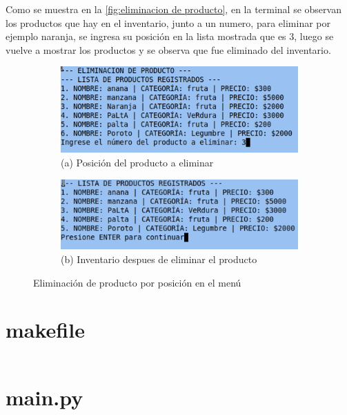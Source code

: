 \documentclass[12pt]{article}
\begin{document}
Como se muestra en la \autoref{fig:eliminacion de producto}, en la terminal se observan los productos que hay en el inventario, junto a un numero, para eliminar por ejemplo naranja, se ingresa su posición en la lista mostrada que es $3$, luego se vuelve a mostrar los productos y se observa que fue eliminado del inventario.
\begin{figure}[H]
    \centering

    \begin{subfigure}[b]{0.6\textwidth}
        \centering
        \includegraphics[width=\textwidth]{Imagenes/img12.png}
        \caption*{(a) Posición del producto a eliminar}
    \end{subfigure}
    \hfill
    \begin{subfigure}[b]{0.6\textwidth}
        \centering
        \includegraphics[width=\textwidth]{Imagenes/img13.png}
        \caption*{(b) Inventario despues de eliminar el producto}
    \end{subfigure}

    \caption{Eliminación de producto por posición en el menú}
    \label{fig:eliminacion de producto}
\end{figure}




\section{makefile}
\inputminted[fontsize=\small]{make}{Codigo/makefile}

\section{main.py}
\inputminted[fontsize=\small, breaklines=true]{python}{Codigo/main.py}
\end{document}
